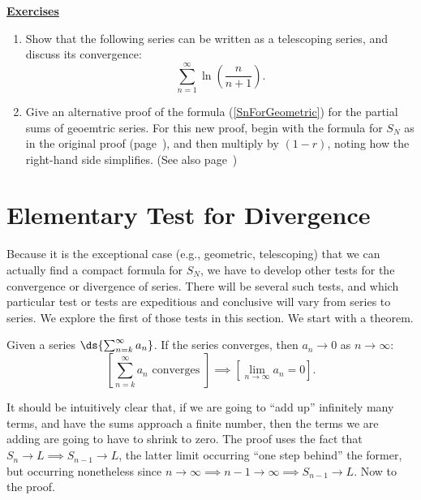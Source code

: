\eex







\newpage
\begin{center}
\underline{\Large{\bf Exercises}}\end{center}

\begin{multicols}{2}

\begin{enumerate}
\item Show that the following series can be
      written as a telescoping series, and discuss
      its convergence: $$\sum_{n=1}^{\infty}\ln\left(\frac{n}{n+1}\right).$$
\item Give an alternative proof of the formula (\ref{SnForGeometric})
      for the partial sums of geoemtric series.
      For this new proof, begin with the formula for $S_N$ as
      in the original proof (page~\pageref{SnForGeometric}),
      and then multiply by $(1-r)$, noting how the right-hand side
      simplifies.  (See also page~\pageref{aN-bN})
      



\end{enumerate}
\vfill
\end{multicols}
\eject


\section{Elementary Test for Divergence}
Because it is the exceptional case (e.g., geometric, telescoping)
that we can actually find a compact
formula for $S_N$, we have to develop other tests for the convergence
or divergence of series.  There will be several such tests, and
which particular test or tests are expeditious and conclusive 
will vary from series to series.  We explore the first of those
tests in this section.  We start with a theorem.

\begin{theorem} Given a series $\ds{\sum_{n=k}^\infty a_n}$.
If the series converges, then $a_n\longrightarrow0$ as $n\to\infty$:
\begin{equation}
\left[\sum_{n=k}^\infty a_n\text{ converges }\right]\implies
\left[\lim_{n\to\infty}a_n=0\right].
\label{SeriesConvergesImpliesTermsShrinkToZero}
\end{equation}
\label{SeriesConvergesImpliesTermsShrinkToZeroTheorem}\end{theorem}
It should be intuitively clear that, if we are going to ``add up''
infinitely many terms, and have the sums approach a finite number, 
then the  
terms we are adding are going to have to shrink to zero.  
The proof uses the fact
that $S_n\to L\implies S_{n-1}\to L$, the latter limit occurring
``one step behind'' the former, but occurring nonetheless
since $n\to\infty\implies n-1\to\infty\implies S_{n-1}\to L$.
Now to the proof.

